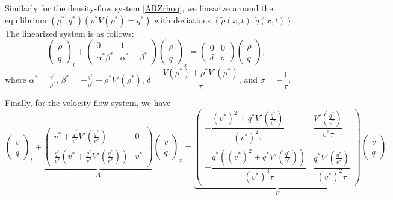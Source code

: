 \documentclass[preprint]{elsarticle}
\begin{document}
Similarly for the density-flow system \eqref{ARZrhoq}, we linearize around the equilibrium $(\rho^*, q^*)(\rho^*V(\rho^*) = q^*)$ with deviations $(\tilde{\rho}(x,t), \tilde{q}(x,t))$. The linearized system is as follows:  
\begin{equation} \label{rhoqlin}
\begin{pmatrix}
\tilde{\rho} \\ \tilde{q}
\end{pmatrix}_t
+ \begin{pmatrix}
0 & 1 \\
\alpha^* \beta^* & \alpha^* - \beta^* 
\end{pmatrix}
\begin{pmatrix}
\tilde{\rho} \\ \tilde{q}
\end{pmatrix}_x = 
\begin{pmatrix}
0 & 0 \\
\delta & \sigma
\end{pmatrix}
\begin{pmatrix}
\tilde{\rho} \\ \tilde{q}
\end{pmatrix},
\end{equation}
where $\alpha^* = \frac{q^*}{\rho^*}$, $\beta^* = -\frac{q^*}{\rho^*} - \rho^* V'(\rho^*)$, $\delta = \dfrac{V(\rho^*)+\rho^*V'( \rho^*)}{\tau}$, and $\sigma = -\dfrac{1}{\tau}$.

Finally, for the velocity-flow system, we have
\begin{equation} \label{vqlin}
\begin{pmatrix}
\tilde{v} \\ \tilde{q}
\end{pmatrix}_t
+ 
\underset{A}{
	\underbrace{
		\begin{pmatrix}
		v^* + \frac{q^*}{v^*} V'\left(\frac{q^*}{v^*}\right) & 0 \\
		\frac{q^*}{v^*} \left( v^* + \frac{q^*}{v^*} V'\left(\frac{q^*}					{v^*}\right)\right) & v^*
		\end{pmatrix}
	}
}
\begin{pmatrix}
\tilde{v} \\ \tilde{q}
\end{pmatrix}_x 
= 
\underset{B}{
	\underbrace{
		\begin{pmatrix}
		-\dfrac{(v^*)^2+q^*V'\left(\frac{q^*}{v^*}\right)}{(v^*)^2 \tau} & 				\dfrac{V'\left(\frac{q^*}{v^*}\right)}{v^* \tau} \\
		-\dfrac{q^*\left((v^*)^2 + q^*V'\left(\frac{q^*}{v^*}\right)\right)}{(v^*)^3 \tau}  & \dfrac{q^*V'\left(\frac{q^*}{v^*}\right)}{(v^*)^2 \tau}
		\end{pmatrix}
	}
}
\begin{pmatrix}
\tilde{v} \\ \tilde{q}
\end{pmatrix}.
\end{equation}
\end{document}
